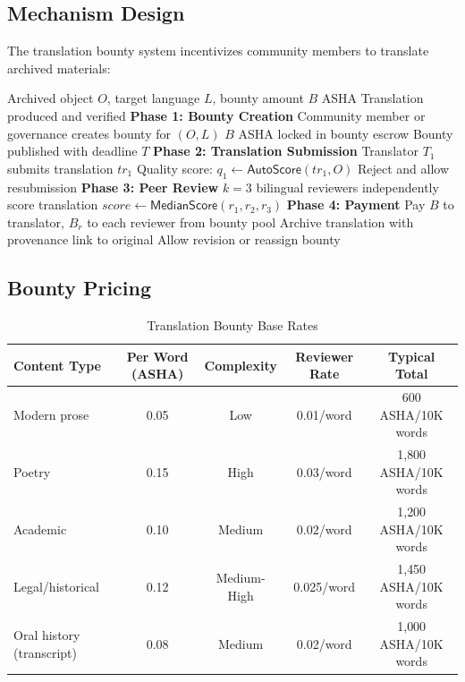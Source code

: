\documentclass[11pt,a4paper]{article}
\begin{document}
\subsection{Mechanism Design}

The translation bounty system incentivizes community members to translate archived materials:

\begin{algorithm}[H]
\caption{Translation Bounty Workflow}
\label{alg:bounty}
\begin{algorithmic}[1]
\Require Archived object $O$, target language $L$, bounty amount $B$ ASHA
\Ensure Translation produced and verified
\Statex \textbf{Phase 1: Bounty Creation}
\State Community member or governance creates bounty for $(O, L)$
\State $B$ ASHA locked in bounty escrow
\State Bounty published with deadline $T$
\Statex \textbf{Phase 2: Translation Submission}
\State Translator $T_1$ submits translation $\mathit{tr}_1$
\State Quality score: $q_1 \leftarrow \mathsf{AutoScore}(\mathit{tr}_1, O)$ 
    \State Reject and allow resubmission
\EndIf
\Statex \textbf{Phase 3: Peer Review}
\State $k = 3$ bilingual reviewers independently score translation
\State $\mathit{score} \leftarrow \mathsf{MedianScore}(r_1, r_2, r_3)$
\Statex \textbf{Phase 4: Payment}
    \State Pay $B$ to translator, $B_r$ to each reviewer from bounty pool
    \State Archive translation with provenance link to original
\Else
    \State Allow revision or reassign bounty
\EndIf
\end{algorithmic}
\end{algorithm}

\subsection{Bounty Pricing}

\begin{table}[H]
\centering
\caption{Translation Bounty Base Rates}
\label{tab:bounty-rates}
\begin{tabular}{lcccc}
\toprule
\textbf{Content Type} & \textbf{Per Word (ASHA)} & \textbf{Complexity} & \textbf{Reviewer Rate} & \textbf{Typical Total} \\
\midrule
Modern prose & 0.05 & Low & 0.01/word & 600 ASHA/10K words \\
Poetry & 0.15 & High & 0.03/word & 1{,}800 ASHA/10K words \\
Academic & 0.10 & Medium & 0.02/word & 1{,}200 ASHA/10K words \\
Legal/historical & 0.12 & Medium-High & 0.025/word & 1{,}450 ASHA/10K words \\
Oral history (transcript) & 0.08 & Medium & 0.02/word & 1{,}000 ASHA/10K words \\
\bottomrule
\end{tabular}
\end{table}
\end{document}
